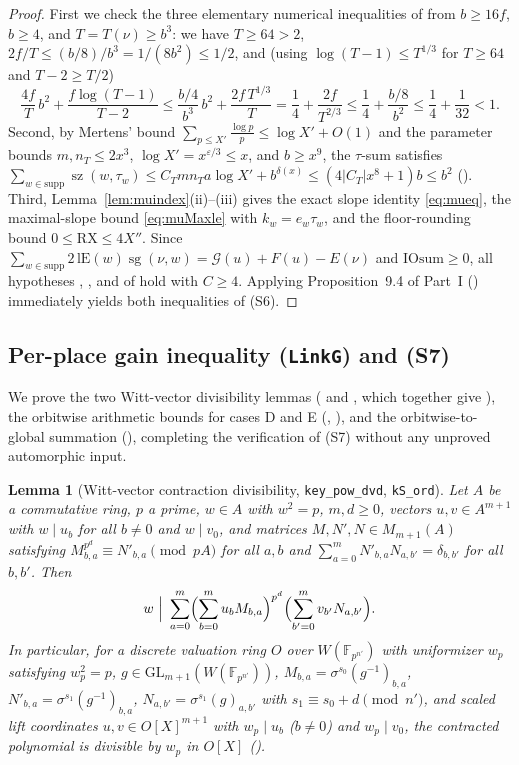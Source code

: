 \documentclass[11pt]{amsart}
\newcommand{\eps}{\varepsilon}
\DeclareMathOperator{\sz}{sz}
\theoremstyle{plain}
\newtheorem{lemma}[theorem]{Lemma}
\theoremstyle{definition}
\numberwithin{equation}{section}
\begin{document}
\begin{proof}
First we check the three elementary numerical inequalities of  from $b\ge 16f$,
$b\ge 4$, and $T=T(\nu)\ge b^3$: we have $T\ge 64>2$, $2f/T\le (b/8)/b^3=1/(8b^2)\le 1/2$, and
(using $\log(T-1)\le T^{1/3}$ for $T\ge 64$ and $T-2\ge T/2$)
\[
\frac{4f}{T}\,b^2+\frac{f\log(T-1)}{T-2}\le\frac{b/4}{b^3}\,b^2+\frac{2f\,T^{1/3}}{T}
=\frac14+\frac{2f}{T^{2/3}}\le\frac14+\frac{b/8}{b^2}\le\frac14+\frac{1}{32}<1.
\]
Second, by Mertens' bound $\sum_{p\le X'}\frac{\log p}{p}\le\log X'+O(1)$ and the parameter bounds
$m,n_T\le 2x^3$, $\log X'=x^{\eps/3}\le x$, and $b\ge x^9$, the $\tau$-sum satisfies
$\sum_{w\in\mathrm{supp}}\sz(w,\tau_w)\le C_T m n_T a\log X'+b^{\delta(x)}\le (4|C_T|x^8+1)b\le b^2$
(). Third, Lemma~\ref{lem:muindex}(ii)--(iii) gives the exact slope identity
\eqref{eq:mueq}, the maximal-slope bound \eqref{eq:muMaxle} with $k_w=e_w\tau_w$, and the
floor-rounding bound $0\le\mathrm{RX}\le 4X''$. Since $\sum_{w\in\mathrm{supp}}2\,\mathrm{lE}(w)\operatorname{sg}(\nu,w)
=\mathcal G(u)+F(u)-E(\nu)$ and $\mathrm{IOsum}\ge 0$, all hypotheses , ,
and  of  hold with $C\ge 4$. Applying Proposition~9.4 of Part~I
() immediately yields both inequalities of \textup{(S6)}.
\end{proof}

\subsection{Per-place gain inequality (\texttt{LinkG}) and (S7)}

We prove the two Witt-vector divisibility lemmas ( and , which together
give ), the orbitwise arithmetic bounds for cases D and E (,
), and the orbitwise-to-global summation (),
completing the verification of \textup{(S7)} without any unproved automorphic input.

\begin{lemma}[Witt-vector contraction divisibility, \texttt{key\_pow\_dvd}, \texttt{kS\_ord}]\label{lem:kSord}
Let $A$ be a commutative ring, $p$ a prime, $w\in A$ with $w^2=p$, $m,d\ge 0$, vectors
$u,v\in A^{m+1}$ with $w\mid u_b$ for all $b\neq 0$ and $w\mid v_0$, and matrices
$M,N',N\in M_{m+1}(A)$ satisfying $M_{b,a}^{p^d}\equiv N'_{b,a}\pmod{pA}$ for all $a,b$ and
$\sum_{a=0}^m N'_{b,a}N_{a,b'}=\delta_{b,b'}$ for all $b,b'$. Then
\[
w\ \Big|\ \sum_{a=0}^m\Bigl(\sum_{b=0}^m u_b M_{b,a}\Bigr)^{p^d}\Bigl(\sum_{b'=0}^m v_{b'}N_{a,b'}\Bigr).
\]
In particular, for a discrete valuation ring $O$ over $W(\mathbb F_{p^{n'}})$ with uniformizer
$w_p$ satisfying $w_p^2=p$, $g\in\mathrm{GL}_{m+1}(W(\mathbb F_{p^{n'}}))$,
$M_{b,a}=\sigma^{s_0}(g^{-1})_{b,a}$, $N'_{b,a}=\sigma^{s_1}(g^{-1})_{b,a}$,
$N_{a,b'}=\sigma^{s_1}(g)_{a,b'}$ with $s_1\equiv s_0+d\pmod{n'}$, and scaled lift coordinates
$u,v\in O[X]^{m+1}$ with $w_p\mid u_b$ ($b\neq 0$) and $w_p\mid v_0$, the contracted polynomial is
divisible by $w_p$ in $O[X]$ ().
\end{lemma}
\end{document}
